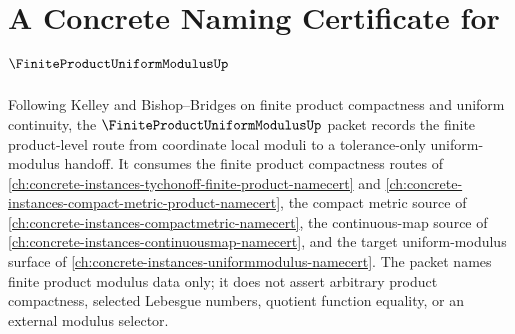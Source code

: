 \chapter{A Concrete Naming Certificate for $\FiniteProductUniformModulusUp$}
\label{ch:concrete-instances-finite-product-uniform-modulus-namecert}

Following Kelley and Bishop--Bridges on finite product compactness and uniform continuity, the $\FiniteProductUniformModulusUp$ packet records the finite product-level route from coordinate local moduli to a tolerance-only uniform-modulus handoff. It consumes the finite product compactness routes of \autoref{ch:concrete-instances-tychonoff-finite-product-namecert} and \autoref{ch:concrete-instances-compact-metric-product-namecert}, the compact metric source of \autoref{ch:concrete-instances-compactmetric-namecert}, the continuous-map source of \autoref{ch:concrete-instances-continuousmap-namecert}, and the target uniform-modulus surface of \autoref{ch:concrete-instances-uniformmodulus-namecert}. The packet names finite product modulus data only; it does not assert arbitrary product compactness, selected Lebesgue numbers, quotient function equality, or an external modulus selector.

